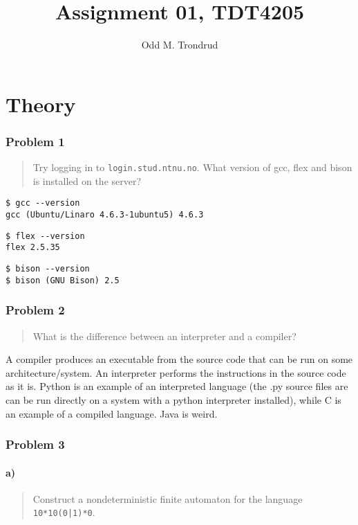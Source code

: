 \documentclass[12pt]{article}
\title{Assignment 01, TDT4205}
\author{Odd M. Trondrud}
\begin{document}
\maketitle

\part{Theory}
\section{Problem 1}
\begin{quote}
Try logging in to \texttt{login.stud.ntnu.no}. What version of gcc, flex and bison is installed on the server?
\end{quote}

\begin{verbatim}
$ gcc --version
gcc (Ubuntu/Linaro 4.6.3-1ubuntu5) 4.6.3
\end{verbatim}

\begin{verbatim}
$ flex --version
flex 2.5.35
\end{verbatim}

\begin{verbatim}
$ bison --version
$ bison (GNU Bison) 2.5
\end{verbatim}

\section{Problem 2}
\begin{quote}
What is the difference between an interpreter and a compiler?
\end{quote}

A compiler produces an executable from the source code that can be run on some architecture/system.
An interpreter performs the instructions in the source code as it is.
Python is an example of an interpreted language (the .py source files are can be run directly on a system with a python interpreter installed), while C is an example of a compiled language.
Java is weird.

\section{Problem 3}
\subsection{a)}
\begin{quote}
Construct a nondeterministic finite automaton for the language \texttt{10*10(0|1)*0}.
\end{quote}
\end{document}
